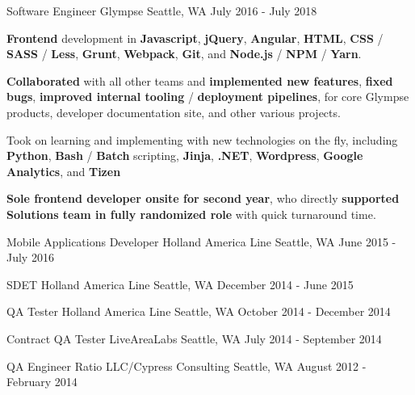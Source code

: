 \begin{cventries}
\cventry
{Software Engineer} %
{Glympse} %
{Seattle, WA} %
{July 2016 - July 2018} %
{
\begin{cvitems}
\item {\textbf{Frontend} development in \textbf{Javascript}, \textbf{jQuery}, \textbf{Angular}, \textbf{HTML}, \textbf{CSS} / \textbf{SASS} / \textbf{Less}, \textbf{Grunt}, \textbf{Webpack}, \textbf{Git}, and \textbf{Node.js} / \textbf{NPM} / \textbf{Yarn}.}
\item {\textbf{Collaborated} with all other teams and \textbf{implemented new features}, \textbf{fixed bugs}, \textbf{improved internal tooling} / \textbf{deployment pipelines}, for core Glympse products, developer documentation site, and other various projects.}
\item {Took on learning and implementing with new technologies on the fly, including \textbf{Python}, \textbf{Bash} / \textbf{Batch} scripting, \textbf{Jinja}, \textbf{.NET}, \textbf{Wordpress}, \textbf{Google Analytics}, and \textbf{Tizen}}
\item {\textbf{Sole frontend developer onsite for second year}, who directly \textbf{supported Solutions team in fully randomized role} with quick turnaround time.}
\end{cvitems}
}

\cventry
{Mobile Applications Developer} %
{Holland America Line} %
{Seattle, WA} %
{June 2015 - July 2016} %
{}

\cventry
{SDET} %
{Holland America Line} %
{Seattle, WA} %
{December 2014 - June 2015} %
{}

\cventry
{QA Tester} %
{Holland America Line} %
{Seattle, WA} %
{October 2014 - December 2014} %
{}

\cventry
{Contract QA Tester} %
{LiveAreaLabs} %
{Seattle, WA} %
{July 2014 - September 2014} %
{}

\cventry
{QA Engineer} %
{Ratio LLC/Cypress Consulting} %
{Seattle, WA} %
{August 2012 - February 2014} %
{}


\end{cventries}
